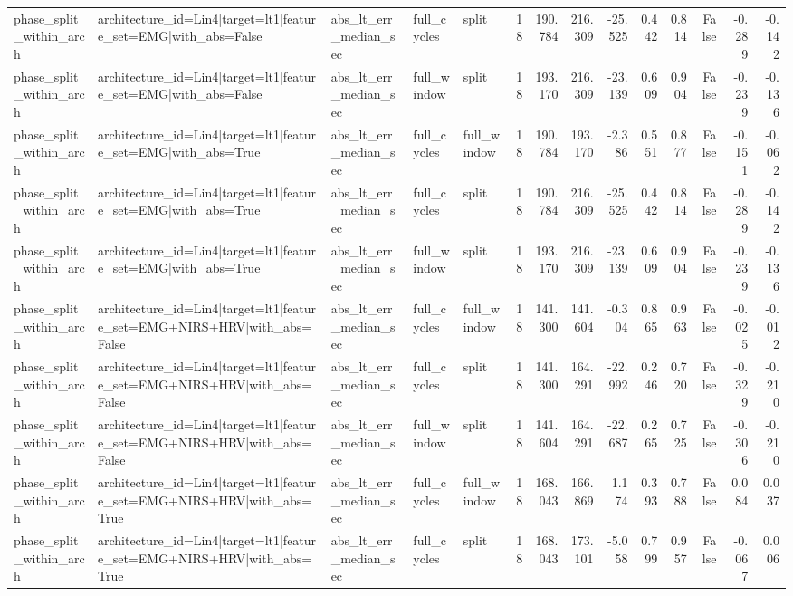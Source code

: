 \begin{table}
\begin{tabular}{lllllrrrrrrrrr}
phase_split_within_arch & architecture_id=Lin4|target=lt1|feature_set=EMG|with_abs=False & abs_lt_err_median_sec & full_cycles & split & 18 & 190.784 & 216.309 & -25.525 & 0.442 & 0.814 & False & -0.289 & -0.142 \\
phase_split_within_arch & architecture_id=Lin4|target=lt1|feature_set=EMG|with_abs=False & abs_lt_err_median_sec & full_window & split & 18 & 193.170 & 216.309 & -23.139 & 0.609 & 0.904 & False & -0.239 & -0.136 \\
phase_split_within_arch & architecture_id=Lin4|target=lt1|feature_set=EMG|with_abs=True & abs_lt_err_median_sec & full_cycles & full_window & 18 & 190.784 & 193.170 & -2.386 & 0.551 & 0.877 & False & -0.151 & -0.062 \\
phase_split_within_arch & architecture_id=Lin4|target=lt1|feature_set=EMG|with_abs=True & abs_lt_err_median_sec & full_cycles & split & 18 & 190.784 & 216.309 & -25.525 & 0.442 & 0.814 & False & -0.289 & -0.142 \\
phase_split_within_arch & architecture_id=Lin4|target=lt1|feature_set=EMG|with_abs=True & abs_lt_err_median_sec & full_window & split & 18 & 193.170 & 216.309 & -23.139 & 0.609 & 0.904 & False & -0.239 & -0.136 \\
phase_split_within_arch & architecture_id=Lin4|target=lt1|feature_set=EMG+NIRS+HRV|with_abs=False & abs_lt_err_median_sec & full_cycles & full_window & 18 & 141.300 & 141.604 & -0.304 & 0.865 & 0.963 & False & -0.025 & -0.012 \\
phase_split_within_arch & architecture_id=Lin4|target=lt1|feature_set=EMG+NIRS+HRV|with_abs=False & abs_lt_err_median_sec & full_cycles & split & 18 & 141.300 & 164.291 & -22.992 & 0.246 & 0.720 & False & -0.329 & -0.210 \\
phase_split_within_arch & architecture_id=Lin4|target=lt1|feature_set=EMG+NIRS+HRV|with_abs=False & abs_lt_err_median_sec & full_window & split & 18 & 141.604 & 164.291 & -22.687 & 0.265 & 0.725 & False & -0.306 & -0.210 \\
phase_split_within_arch & architecture_id=Lin4|target=lt1|feature_set=EMG+NIRS+HRV|with_abs=True & abs_lt_err_median_sec & full_cycles & full_window & 18 & 168.043 & 166.869 & 1.174 & 0.393 & 0.788 & False & 0.084 & 0.037 \\
phase_split_within_arch & architecture_id=Lin4|target=lt1|feature_set=EMG+NIRS+HRV|with_abs=True & abs_lt_err_median_sec & full_cycles & split & 18 & 168.043 & 173.101 & -5.058 & 0.799 & 0.957 & False & -0.067 & 0.006 \\

\end{tabular}
\end{table}
